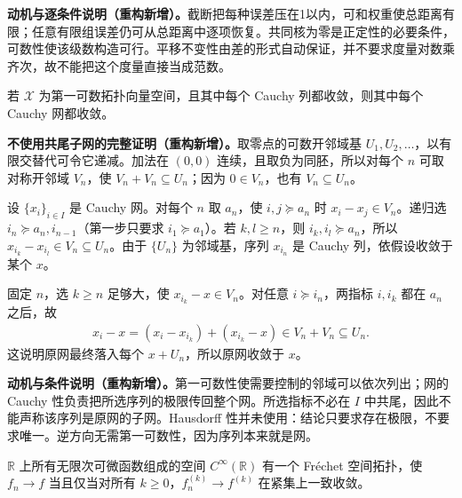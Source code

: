 \documentclass[../../main.tex]{subfiles}
\begin{document}
\begin{remark}
\textbf{动机与逐条件说明（重构新增）。}截断把每种误差压在1以内，可和权重使总距离有限；任意有限组误差仍可从总距离中逐项恢复。共同核为零是正定性的必要条件，可数性使该级数构造可行。平移不变性由差的形式自动保证，并不要求度量对数乘齐次，故不能把这个度量直接当成范数。
\end{remark}
\begin{exercise}\label{exercise:ch05-sequential-completeness-nets}
若 $\mathcal X$ 为第一可数拓扑向量空间，且其中每个 Cauchy 列都收敛，则其中每个 Cauchy 网都收敛。
\end{exercise}
\begin{solution}
\textbf{不使用共尾子网的完整证明（重构新增）。}取零点的可数开邻域基 $U_1,U_2,\ldots$，以有限交替代可令它递减。加法在 $(0,0)$ 连续，且取负为同胚，所以对每个 $n$ 可取对称开邻域 $V_n$，使 $V_n+V_n\subseteq U_n$；因为 $0\in V_n$，也有 $V_n\subseteq U_n$。

设 $\{x_i\}_{i\in I}$ 是 Cauchy 网。对每个 $n$ 取 $a_n$，使 $i,j\succeq a_n$ 时 $x_i-x_j\in V_n$。递归选 $i_n\succeq a_n,i_{n-1}$（第一步只要求 $i_1\succeq a_1$）。若 $k,l\ge n$，则 $i_k,i_l\succeq a_n$，所以 $x_{i_k}-x_{i_l}\in V_n\subseteq U_n$。由于 $\{U_n\}$ 为邻域基，序列 $x_{i_n}$ 是 Cauchy 列，依假设收敛于某个 $x$。

固定 $n$，选 $k\ge n$ 足够大，使 $x_{i_k}-x\in V_n$。对任意 $i\succeq i_n$，两指标 $i,i_k$ 都在 $a_n$ 之后，故
\begin{align*}
x_i-x=(x_i-x_{i_k})+(x_{i_k}-x)\in V_n+V_n\subseteq U_n.
\end{align*}
这说明原网最终落入每个 $x+U_n$，所以原网收敛于 $x$。
\end{solution}
\begin{remark}
\textbf{动机与条件说明（重构新增）。}第一可数性使需要控制的邻域可以依次列出；网的 Cauchy 性负责把所选序列的极限传回整个网。所选指标不必在 $I$ 中共尾，因此不能声称该序列是原网的子网。Hausdorff 性并未使用：结论只要求存在极限，不要求唯一。逆方向无需第一可数性，因为序列本来就是网。
\end{remark}
\begin{exercise}\label{exercise:ch05-smooth-real-line-frechet}
$\mathbb R$ 上所有无限次可微函数组成的空间 $C^\infty(\mathbb R)$ 有一个 Fr\'echet 空间拓扑，使 $f_n\to f$ 当且仅当对所有 $k\ge0$，$f_n^{(k)}\to f^{(k)}$ 在紧集上一致收敛。
\end{exercise}
\end{document}
